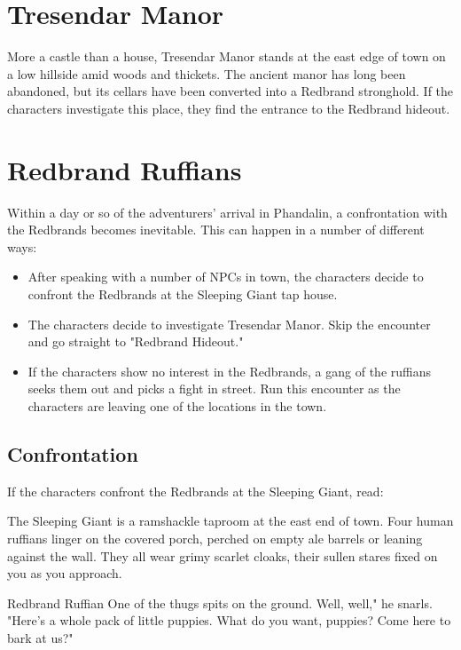 \documentclass[10pt,a4paper,twoside,bg=print,twocolumn,openany,nodeprecatedcode]{dndbook}
\begin{document}
\section{Tresendar Manor}
More a castle than a house, Tresendar Manor stands at the east edge of town on a low hillside amid woods and thickets. The ancient manor has long been abandoned, but its cellars have been converted into a Redbrand stronghold. If the characters investigate this place, they find the entrance to the Redbrand hideout.

\section{Redbrand Ruffians}
Within a day or so of the adventurers' arrival in Phandalin, a confrontation with the Redbrands becomes inevitable. This can happen in a number of different ways:


\begin{itemize}
\item After speaking with a number of NPCs in town, the characters decide to confront the Redbrands at the Sleeping Giant tap house.
\item The characters decide to investigate Tresendar Manor. Skip the encounter and go straight to "Redbrand Hideout."
\item If the characters show no interest in the Redbrands, a gang of the ruffians seeks them out and picks a fight in street. Run this encounter as the characters are leaving one of the locations in the town.
\end{itemize}

\subsection{Confrontation}
If the characters confront the Redbrands at the Sleeping Giant, read:

\begin{DndSidebar}[float=!b]{}
The Sleeping Giant is a ramshackle taproom at the east end of town. Four human ruffians linger on the covered porch, perched on empty ale barrels or leaning against the wall. They all wear grimy scarlet cloaks, their sullen stares fixed on you as you approach.



\end{DndSidebar}

\begin{DndSidebar}[float=!b]{Redbrand Ruffian}
One of the thugs spits on the ground. Well, well," he snarls. "Here's a whole pack of little puppies. What do you want, puppies? Come here to bark at us?"



\end{DndSidebar}
\end{document}
